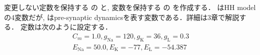 変更しない定数を保持する  の  と, 変数を保持する  の  を作成する． はHH modelの4変数だが,  はpre-synaptic dynamicsを表す変数である．詳細は3章で解説する． 定数は次のように設定する． 
$$
\begin{aligned}
C_m=1.0, g_{\text{Na}}=120, g_{\text{K}}=36, g_{\text{L}}=0.3\\
E_{\text{Na}}=50.0, E_{\text{K}}=-77, E_{\text{L}}=-54.387 
\end{aligned}
$$
